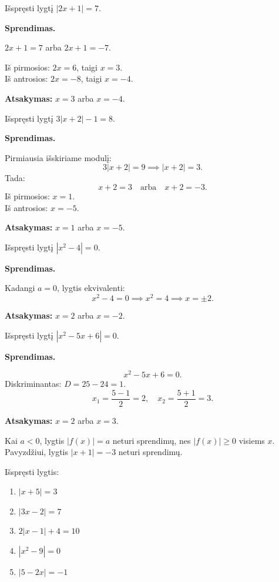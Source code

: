 \begin{example}
Išspręsti lygtį $|2x + 1| = 7$.

\textbf{Sprendimas.}

$2x + 1 = 7$ arba $2x + 1 = -7$.

Iš pirmosios: $2x = 6$, taigi $x = 3$.\\
Iš antrosios: $2x = -8$, taigi $x = -4$.

\textbf{Atsakymas:} $x = 3$ arba $x = -4$.
\end{example}

\begin{example}
Išspręsti lygtį $3|x + 2| - 1 = 8$.

\textbf{Sprendimas.}

Pirmiausia išskiriame modulį:
\[
3|x + 2| = 9 \implies |x + 2| = 3.
\]
Tada:
\[
x + 2 = 3 \quad \text{arba} \quad x + 2 = -3.
\]
Iš pirmosios: $x = 1$.\\
Iš antrosios: $x = -5$.

\textbf{Atsakymas:} $x = 1$ arba $x = -5$.
\end{example}

\begin{example}
Išspręsti lygtį $|x^2 - 4| = 0$.

\textbf{Sprendimas.}

Kadangi $a = 0$, lygtis ekvivalenti:
\[
x^2 - 4 = 0 \implies x^2 = 4 \implies x = \pm 2.
\]

\textbf{Atsakymas:} $x = 2$ arba $x = -2$.
\end{example}

\begin{example}
Išspręsti lygtį $|x^2 - 5x + 6| = 0$.

\textbf{Sprendimas.}

\[
x^2 - 5x + 6 = 0.
\]
Diskriminantas: $D = 25 - 24 = 1$.
\[
x_1 = \frac{5 - 1}{2} = 2, \quad x_2 = \frac{5 + 1}{2} = 3.
\]

\textbf{Atsakymas:} $x = 2$ arba $x = 3$.
\end{example}

\begin{remark}
Kai $a < 0$, lygtis $|f(x)| = a$ neturi sprendimų, nes $|f(x)| \geq 0$ visiems $x$. Pavyzdžiui, lygtis $|x + 1| = -3$ neturi sprendimų.
\end{remark}

\begin{exercise}
Išspręsti lygtis:
\begin{enumerate}[label=\alph*)]
    \item $|x + 5| = 3$
    \item $|3x - 2| = 7$
    \item $2|x - 1| + 4 = 10$
    \item $|x^2 - 9| = 0$
    \item $|5 - 2x| = -1$
\end{enumerate}
\end{exercise}

